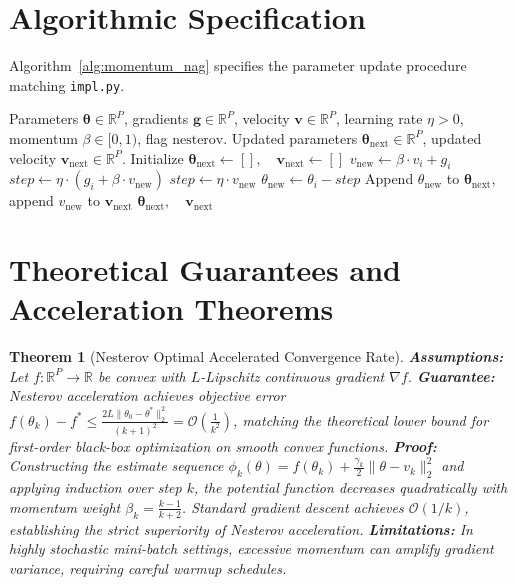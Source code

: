 \documentclass[11pt]{article}
\newtheorem{theorem}{Theorem}
\begin{document}
\section{Algorithmic Specification}
\label{sec:algorithm}

Algorithm~\ref{alg:momentum_nag} specifies the parameter update procedure matching \texttt{impl.py}.

\begin{algorithm}[H]
\caption{Polyak Heavy-Ball and Nesterov Accelerated Gradient Update}
\label{alg:momentum_nag}
\begin{algorithmic}[1]
\Require Parameters $\boldsymbol{\theta} \in \mathbb{R}^P$, gradients $\mathbf{g} \in \mathbb{R}^P$, velocity $\mathbf{v} \in \mathbb{R}^P$, learning rate $\eta > 0$, momentum $\beta \in [0, 1)$, flag $\mathrm{nesterov}$.
\Ensure Updated parameters $\boldsymbol{\theta}_{\mathrm{next}} \in \mathbb{R}^P$, updated velocity $\mathbf{v}_{\mathrm{next}} \in \mathbb{R}^P$.
\State Initialize $\boldsymbol{\theta}_{\mathrm{next}} \gets [], \quad \mathbf{v}_{\mathrm{next}} \gets []$
    \State $v_{\mathrm{new}} \gets \beta \cdot v_i + g_i$
        \State $step \gets \eta \cdot (g_i + \beta \cdot v_{\mathrm{new}})$
    \Else
        \State $step \gets \eta \cdot v_{\mathrm{new}}$
    \EndIf
    \State $\theta_{\mathrm{new}} \gets \theta_i - step$
    \State Append $\theta_{\mathrm{new}}$ to $\boldsymbol{\theta}_{\mathrm{next}}$, append $v_{\mathrm{new}}$ to $\mathbf{v}_{\mathrm{next}}$
\EndFor
\State \Return $\boldsymbol{\theta}_{\mathrm{next}}, \quad \mathbf{v}_{\mathrm{next}}$
\end{algorithmic}
\end{algorithm}

\section{Theoretical Guarantees and Acceleration Theorems}
\label{sec:guarantees}

\begin{theorem}[Nesterov Optimal Accelerated Convergence Rate]
\label{thm:nesterov_rate}
\textbf{Assumptions:} Let $f: \mathbb{R}^P \to \mathbb{R}$ be convex with $L$-Lipschitz continuous gradient $\nabla f$.
\textbf{Guarantee:} Nesterov acceleration achieves objective error $f(\theta_k) - f^* \le \frac{2 L \|\theta_0 - \theta^*\|_2^2}{(k+1)^2} = \mathcal{O}\left(\frac{1}{k^2}\right)$, matching the theoretical lower bound for first-order black-box optimization on smooth convex functions.
\textbf{Proof:}
Constructing the estimate sequence $\phi_k(\theta) = f(\theta_k) + \frac{\gamma_k}{2}\|\theta - v_k\|_2^2$ and applying induction over step $k$, the potential function decreases quadratically with momentum weight $\beta_k = \frac{k-1}{k+2}$. Standard gradient descent achieves $\mathcal{O}(1/k)$, establishing the strict superiority of Nesterov acceleration.
\textbf{Limitations:} In highly stochastic mini-batch settings, excessive momentum can amplify gradient variance, requiring careful warmup schedules.
\end{theorem}
\end{document}
